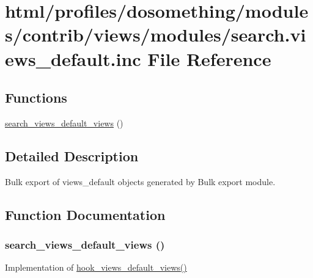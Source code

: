 \hypertarget{search_8views__default_8inc}{
\section{html/profiles/dosomething/modules/contrib/views/modules/search.views\_\-default.inc File Reference}
\label{search_8views__default_8inc}
}
\subsection*{Functions}
\begin{DoxyCompactItemize}
\item 
\hyperlink{search_8views__default_8inc_a2cb88621066893a307a7526fe6a5d70d}{search\_\-views\_\-default\_\-views} ()
\end{DoxyCompactItemize}


\subsection{Detailed Description}
Bulk export of views\_\-default objects generated by Bulk export module. 

\subsection{Function Documentation}
\hypertarget{search_8views__default_8inc_a2cb88621066893a307a7526fe6a5d70d}{
\subsubsection[{search\_\-views\_\-default\_\-views}]{\setlength{\rightskip}{0pt plus 5cm}search\_\-views\_\-default\_\-views ()}}
\label{search_8views__default_8inc_a2cb88621066893a307a7526fe6a5d70d}
Implementation of \hyperlink{group__views__hooks_ga23edb74860682fa88f75cf94b97c2e15}{hook\_\-views\_\-default\_\-views()} 
